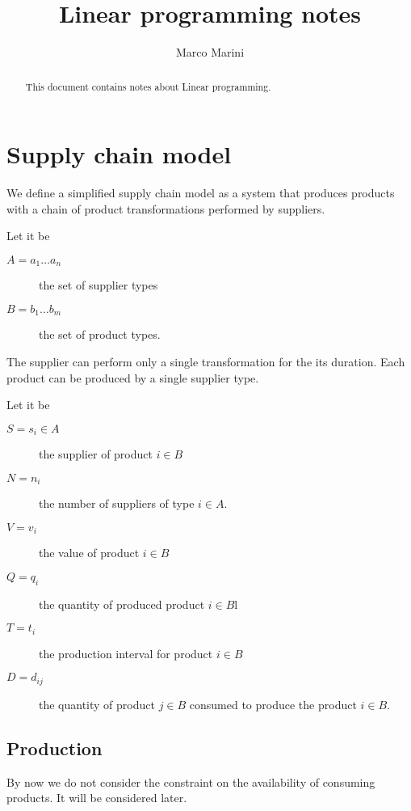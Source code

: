 \documentclass[a4paper,11pt]{article}
\title{Linear programming notes}
\author{Marco Marini}
\begin{document}
\maketitle
\tableofcontents

\begin{abstract}
This document contains notes about Linear programming.
\end{abstract}

\section{Supply chain model}

We define a simplified supply chain model as a system
that produces products with a chain of product transformations performed by suppliers.

Let it be
\begin{description}
	\item [$ A = a_1 \dots a_n $]
		the set of supplier types
	\item [$ B = b_1 \dots b_m $]
		the set of product types.
\end{description}

The supplier can perform only a single transformation for the its duration.
Each product can be produced by a single supplier type.

Let it be
\begin{description}
	\item [$ S = s_i \in A $]
		the supplier of product $ i \in B $
	\item [$ N = n_i $]
		the number of suppliers of type $ i \in A $.
	\item[ $ V = v_{i} $ ]
		the value of product $ i \in B $
	\item[ $ Q = q_{i} $ ]
		the quantity of produced product $ i \in B  $l
	\item[ $ T = t_{i} $ ]
		the production interval for product $ i \in B  $
	\item[$ D = d_{ij} $ ]
		the quantity of product $ j \in B $ consumed to produce the product $ i \in B $.
\end{description}


\subsection{Production}

By now we do not consider the constraint on the availability of consuming products. It will be considered later.
\end{document}
